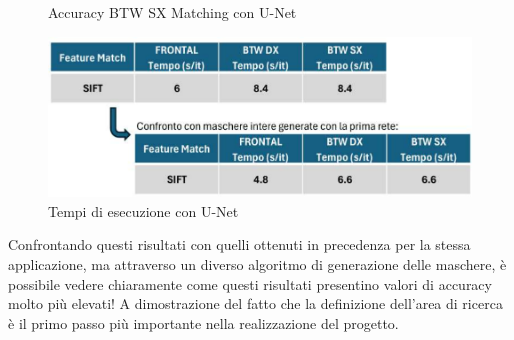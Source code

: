 \documentclass[12pt,a4paper,openright,twoside]{book}
\begin{document}
\begin{itemize}
\begin{figure}[H]
    	\caption{Accuracy BTW SX Matching con U-Net}
	\label{fig:sx4}
\end{figure}
\begin{figure}[H]
	\centering
	\includegraphics{figures/tempi4_1.pdf}
    	\caption{Tempi di esecuzione con U-Net}
	\label{fig:tempi4}
\end{figure}
Confrontando questi risultati con quelli ottenuti in precedenza per la stessa applicazione, ma attraverso un diverso algoritmo di generazione delle maschere, è possibile vedere chiaramente come questi risultati presentino valori di accuracy molto più elevati! A dimostrazione del fatto che la definizione dell'area di ricerca è il primo passo più importante nella realizzazione del progetto.


\end{itemize}
\end{document}
